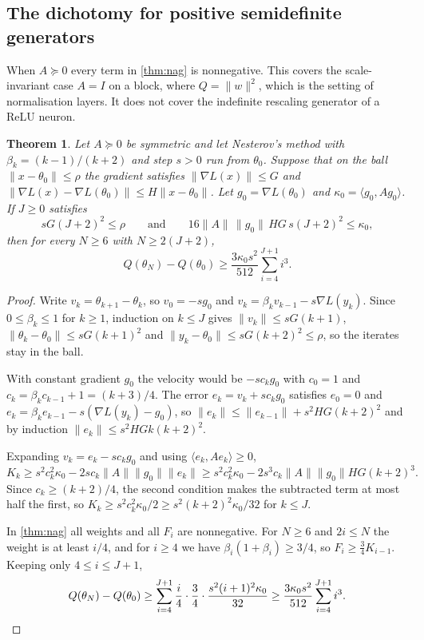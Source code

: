 \documentclass[11pt]{article}
\newtheorem{theorem}{Theorem}
\theoremstyle{remark}
\theoremstyle{definition}
\newcommand{\ip}[2]{\langle #1,#2\rangle}
\begin{document}
\subsection{The dichotomy for positive semidefinite generators}

When $A\succeq0$ every term in \cref{thm:nag} is nonnegative. This covers the scale-invariant case $A=I$ on a block, where $Q=\|w\|^2$, which is the setting of normalisation layers. It does not cover the indefinite rescaling generator of a ReLU neuron.

\begin{theorem}\label{thm:nestlower}
Let $A\succeq0$ be symmetric and let Nesterov's method with $\beta_k=(k-1)/(k+2)$ and step $s>0$ run from $\theta_0$. Suppose that on the ball $\|x-\theta_0\|\le\rho$ the gradient satisfies $\|\nabla L(x)\|\le G$ and $\|\nabla L(x)-\nabla L(\theta_0)\|\le H\|x-\theta_0\|$. Let $g_0=\nabla L(\theta_0)$ and $\kappa_0=\ip{g_0}{Ag_0}$. If $J\ge0$ satisfies
\[
sG(J+2)^2\le\rho\qquad\text{and}\qquad16\|A\|\,\|g_0\|\,HG\,s(J+2)^2\le\kappa_0,
\]
then for every $N\ge6$ with $N\ge2(J+2)$,
\[
Q(\theta_N)-Q(\theta_0)\ge\frac{3\kappa_0s^2}{512}\sum_{i=4}^{J+1}i^3 .
\]
\end{theorem}

\begin{proof}
Write $v_k=\theta_{k+1}-\theta_k$, so $v_0=-sg_0$ and $v_k=\beta_kv_{k-1}-s\nabla L(y_k)$. Since $0\le\beta_k\le1$ for $k\ge1$, induction on $k\le J$ gives $\|v_k\|\le sG(k+1)$, $\|\theta_k-\theta_0\|\le sG(k+1)^2$ and $\|y_k-\theta_0\|\le sG(k+2)^2\le\rho$, so the iterates stay in the ball.

With constant gradient $g_0$ the velocity would be $-sc_kg_0$ with $c_0=1$ and $c_k=\beta_kc_{k-1}+1=(k+3)/4$. The error $e_k=v_k+sc_kg_0$ satisfies $e_0=0$ and $e_k=\beta_ke_{k-1}-s(\nabla L(y_k)-g_0)$, so $\|e_k\|\le\|e_{k-1}\|+s^2HG(k+2)^2$ and by induction $\|e_k\|\le s^2HGk(k+2)^2$.

Expanding $v_k=e_k-sc_kg_0$ and using $\ip{e_k}{Ae_k}\ge0$,
\[
K_k\ge s^2c_k^2\kappa_0-2sc_k\|A\|\|g_0\|\|e_k\|\ge s^2c_k^2\kappa_0-2s^3c_k\|A\|\|g_0\|HG(k+2)^3 .
\]
Since $c_k\ge(k+2)/4$, the second condition makes the subtracted term at most half the first, so $K_k\ge s^2c_k^2\kappa_0/2\ge s^2(k+2)^2\kappa_0/32$ for $k\le J$.

In \cref{thm:nag} all weights and all $F_i$ are nonnegative. For $N\ge6$ and $2i\le N$ the weight is at least $i/4$, and for $i\ge4$ we have $\beta_i(1+\beta_i)\ge3/4$, so $F_i\ge\frac34K_{i-1}$. Keeping only $4\le i\le J+1$,
\[
Q(\theta_N)-Q(\theta_0)\ge\sum_{i=4}^{J+1}\frac i4\cdot\frac34\cdot\frac{s^2(i+1)^2\kappa_0}{32}\ge\frac{3\kappa_0s^2}{512}\sum_{i=4}^{J+1}i^3 .
\qedhere
\]
\end{proof}
\end{document}
